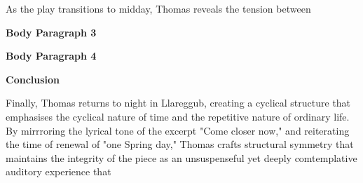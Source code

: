 		As the play transitions to midday, Thomas reveals the tension between

	\textbf{Body Paragraph 3}

	\textbf{Body Paragraph 4}

	\textbf{Conclusion}

Finally, Thomas returns to night in Llareggub, creating a cyclical structure that emphasises the cyclical nature of time and the repetitive nature of ordinary life. By mirrroring the lyrical tone of the excerpt "Come closer now," and reiterating the time of renewal of "one Spring day," Thomas crafts structural symmetry that maintains the integrity of the piece as an unsuspenseful yet deeply comtemplative auditory experience that 
